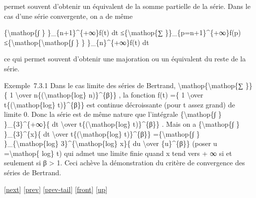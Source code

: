 \documentclass[]{article}
\begin{document}
permet souvent d'obtenir un équivalent de la somme partielle de la
série. Dans le cas d'une série convergente, on a de même

\{\textbackslash{}mathop\{∫ \} \}\_\{n+1\}\^{}\{+∞\}f(t) dt
≤\{\textbackslash{}mathop\{∑ \}\}\_\{p=n+1\}\^{}\{+∞\}f(p)
≤\{\textbackslash{}mathop\{\textbackslash{}mathop\{∫ \} \}
\}\_\{n\}\^{}\{+∞\}f(t) dt

ce qui permet souvent d'obtenir une majoration ou un équivalent du reste
de la série.

Exemple~7.3.1 Dans le cas limite des séries de Bertrand,
\textbackslash{}mathop\{\textbackslash{}mathop\{∑ \}\} \{ 1
\textbackslash{}over n\{(\textbackslash{}mathop\{log\} n)\}\^{}\{β\}\} ,
la fonction f(t) =\{ 1 \textbackslash{}over
t\{(\textbackslash{}mathop\{log\} t)\}\^{}\{β\}\} est continue
décroissante (pour t assez grand) de limite 0. Donc la série est de même
nature que l'intégrale \{\textbackslash{}mathop\{∫ \}
\}\_\{3\}\^{}\{+∞\}\{ dt \textbackslash{}over
t\{(\textbackslash{}mathop\{log\} t)\}\^{}\{β\}\} . Mais on a
\{\textbackslash{}mathop\{∫ \} \}\_\{3\}\^{}\{x\}\{ dt
\textbackslash{}over t\{(\textbackslash{}mathop\{log\} t)\}\^{}\{β\}\}
=\{\textbackslash{}mathop\{∫ \} \}\_\{\textbackslash{}mathop\{log\}
3\}\^{}\{\textbackslash{}mathop\{log\} x\}\{ du \textbackslash{}over
\{u\}\^{}\{β\}\} (poser u =\textbackslash{}mathop\{ log\} t) qui admet
une limite finie quand x tend vers + ∞ si et seulement si β
\textgreater{} 1. Ceci achève la démonstration du critère de convergence
des séries de Bertrand.

{[}\href{coursse38.html}{next}{]} {[}\href{coursse36.html}{prev}{]}
{[}\href{coursse36.html\#tailcoursse36.html}{prev-tail}{]}
{[}\href{coursse37.html}{front}{]}
{[}\href{coursch8.html\#coursse37.html}{up}{]}
\end{document}
